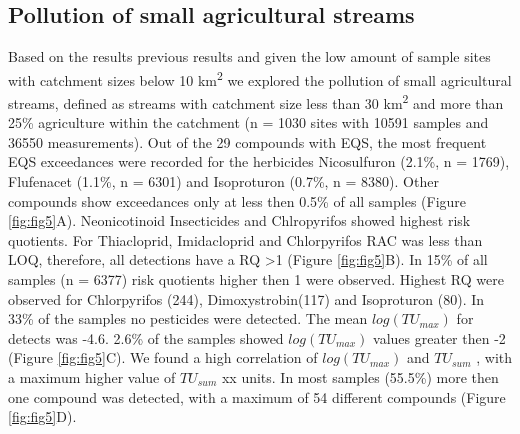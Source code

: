 \documentclass[journal=esthag,manuscript=article]{achemso}
\begin{document}
\subsection{Pollution of small agricultural streams}
Based on the results previous results and given the low amount of sample sites with catchment sizes below 10 km\textsuperscript{2} we explored the pollution of small agricultural streams, defined as streams with catchment size less than 30 km\textsuperscript{2} and more than 25\% agriculture within the catchment (n = 1030 sites with 10591 samples and 36550 measurements).
Out of the 29 compounds with EQS, the most frequent EQS exceedances were recorded for the herbicides Nicosulfuron (2.1\%, n = 1769), Flufenacet (1.1\%, n = 6301) and Isoproturon (0.7\%, n = 8380). 
Other compounds show exceedances only at less then 0.5\% of all samples (Figure \ref{fig:fig5}A).
Neonicotinoid Insecticides and Chlropyrifos showed highest risk quotients.
For Thiacloprid, Imidacloprid and Chlorpyrifos RAC was less than LOQ, therefore, all detections have a RQ \textgreater 1 (Figure \ref{fig:fig5}B). 
In 15\% of all samples (n = 6377) risk quotients higher then 1 were observed.
Highest RQ were observed for Chlorpyrifos (244), Dimoxystrobin(117) and Isoproturon (80). 
In 33\% of the samples no pesticides were detected. 
The mean $log(TU_{max})$ for detects was -4.6.
2.6\% of the samples showed $log(TU_{max})$ values greater then -2 (Figure \ref{fig:fig5}C).
We found a high correlation of $log(TU_{max})$ and $TU_{sum}$ , with a maximum higher value of $TU_{sum}$ xx units.
In most samples (55.5\%) more then one compound was detected, with a maximum of 54 different compounds (Figure \ref{fig:fig5}D). 

\end{document}
